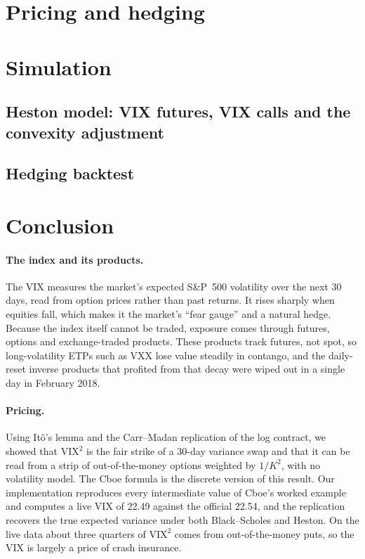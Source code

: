 \documentclass[11pt,a4paper]{article}
\newcommand{\VIX}{\mathrm{VIX}}
\begin{document}
\section{Pricing and hedging}



\section{Simulation}


\subsection{Heston model: VIX futures, VIX calls and the convexity adjustment}


\subsection{Hedging backtest}


\section{Conclusion}
\paragraph{The index and its products.} The VIX measures the market's expected S\&P~500 volatility over the next 30 days, read from option prices rather than past returns. It rises sharply when equities fall, which makes it the market's ``fear gauge'' and a natural hedge. Because the index itself cannot be traded, exposure comes through futures, options and exchange-traded products. These products track futures, not spot, so long-volatility ETPs such as VXX lose value steadily in contango, and the daily-reset inverse products that profited from that decay were wiped out in a single day in February 2018.

\paragraph{Pricing.} Using It\^o's lemma and the Carr--Madan replication of the log contract, we showed that $\VIX^2$ is the fair strike of a 30-day variance swap and that it can be read from a strip of out-of-the-money options weighted by $1/K^2$, with no volatility model. The Cboe formula is the discrete version of this result. Our implementation reproduces every intermediate value of Cboe's worked example and computes a live VIX of 22.49 against the official 22.54, and the replication recovers the true expected variance under both Black--Scholes and Heston. On the live data about three quarters of $\VIX^2$ comes from out-of-the-money puts, so the VIX is largely a price of crash insurance.
\end{document}
